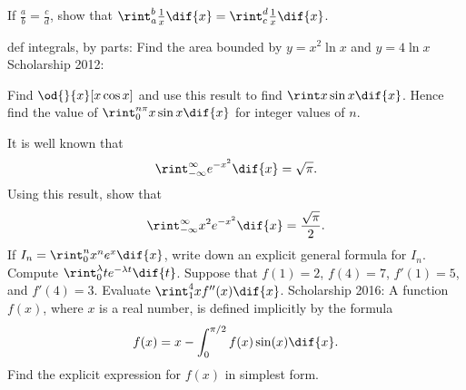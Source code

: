   \item If $ \frac{a}{b} = \frac{c}{d} $, show that $ \rint_a^b \frac{1}{x} \dif{x} = \rint_c^d \frac{1}{x} \dif{x} $.

def integrals, by parts:
  \questioS Find the area bounded by $ y = x^2 \ln x $ and $ y = 4\ln x $
  \question Scholarship 2012:
    \begin{parts}
      \parE Find $ \od{}{x}[x \cos x] $ and use this result to find $ \rint x \sin x \dif{x} $.
      \parS Hence find the value of $ \rint^{n\pi}_0 x \sin x \dif{x} $ for integer values of $ n $.
    \end{parts}
  \questioS It is well known that
       \begin{displaymath}
         \rint^{\infty}_{-\infty} e^{-x^2} \dif{x} = \sqrt{\pi}.
       \end{displaymath}
       Using this result, show that
       \begin{displaymath}
         \rint^{\infty}_{-\infty} x^2 e^{-x^2} \dif{x} = \frac{\sqrt{\pi}}{2}.
       \end{displaymath}
  \questioS If $ I_n = \rint^{n}_0 x^n e^x \dif{x} $, write down an explicit general formula for $ I_n $.
  \questioS Compute $ \rint^\lambda_0 te^{-\lambda t} \dif{t} $.
  \questioS Suppose that $ f(1) = 2 $, $ f(4) = 7 $, $ f'(1) = 5 $, and $ f'(4) = 3 $. Evaluate $ \rint^4_1 xf''(x) \dif{x} $.
  \questioS Scholarship 2016: A function $ f(x) $, where $ x $ is a real number, is defined implicitly by the formula
            \begin{displaymath}
              f(x) = x - \int^{\pi/2}_0 f(x) \sin(x) \dif{x}.
            \end{displaymath}
            Find the explicit expression for $ f(x) $ in simplest form.
